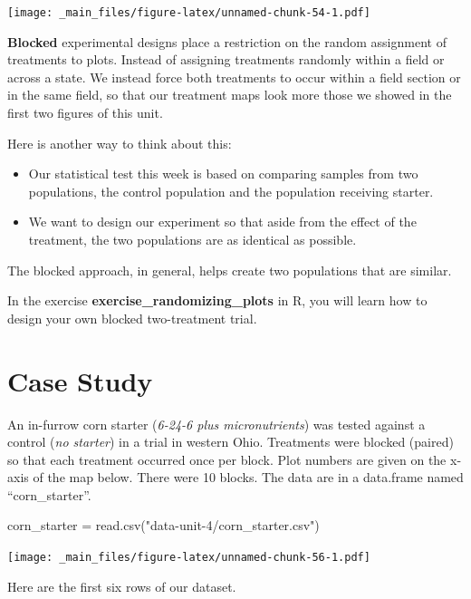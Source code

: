 \documentclass[
]{book}
\newenvironment{Shaded}{\begin{snugshade}}{\end{snugshade}}
\newcommand{\FunctionTok}[1]{\textcolor[rgb]{0.00,0.00,0.00}{#1}}
\newcommand{\NormalTok}[1]{#1}
\newcommand{\OtherTok}[1]{\textcolor[rgb]{0.56,0.35,0.01}{#1}}
\newcommand{\StringTok}[1]{\textcolor[rgb]{0.31,0.60,0.02}{#1}}
\begin{document}
\texttt{[image: \_main\_files/figure-latex/unnamed-chunk-54-1.pdf]}

\textbf{Blocked} experimental designs place a restriction on the random
assignment of treatments to plots. Instead of assigning treatments
randomly within a field or across a state. We instead force both
treatments to occur within a field section or in the same field, so that
our treatment maps look more those we showed in the first two figures of
this unit.

Here is another way to think about this:

\begin{itemize}
\item
  Our statistical test this week is based on comparing samples from
  two populations, the control population and the population receiving
  starter.
\item
  We want to design our experiment so that aside from the effect of
  the treatment, the two populations are as identical as possible.
\end{itemize}

The blocked approach, in general, helps create two populations that are
similar.

In the exercise \textbf{exercise\_randomizing\_plots} in R, you will learn how
to design your own blocked two-treatment trial.

\hypertarget{case-study-2}{%
\section{Case Study}\label{case-study-2}}

An in-furrow corn starter (\emph{6-24-6 plus micronutrients}) was tested
against a control (\emph{no starter}) in a trial in western Ohio. Treatments
were blocked (paired) so that each treatment occurred once per block.
Plot numbers are given on the x-axis of the map below. There were 10
blocks. The data are in a data.frame named ``corn\_starter''.

\begin{Shaded}
\begin{Highlighting}[]
\NormalTok{corn\_starter }\OtherTok{=} \FunctionTok{read.csv}\NormalTok{(}\StringTok{"data{-}unit{-}4/corn\_starter.csv"}\NormalTok{)}
\end{Highlighting}
\end{Shaded}

\texttt{[image: \_main\_files/figure-latex/unnamed-chunk-56-1.pdf]}

Here are the first six rows of our dataset.
\end{document}
